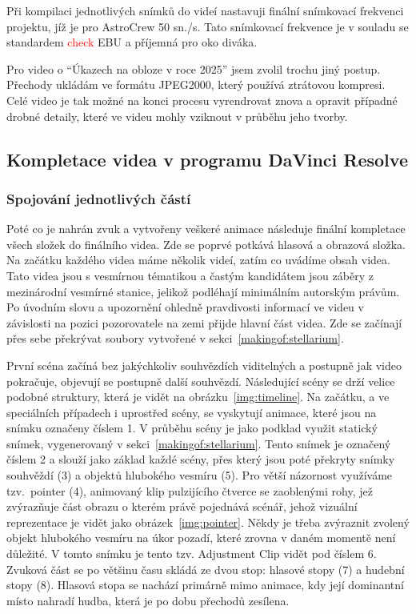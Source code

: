 \documentclass[12pt,a4paper,titlepage]{article}
\begin{document}
Při kompilaci jednotlivých snímků do videí nastavuji finální snímkovací frekvenci projektu, jíž je pro AstroCrew 50 sn./s. Tato snímkovací frekvence je v souladu se standardem \textcolor{red}{check} EBU a příjemná pro oko diváka.

Pro video o \enquote{Úkazech na obloze v roce 2025} jsem zvolil trochu jiný postup. Přechody ukládám ve formátu JPEG2000, který používá ztrátovou kompresi. Celé video je tak možné na konci procesu vyrendrovat znova a opravit případné drobné detaily, které ve videu mohly vziknout v průběhu jeho tvorby.
\subsection{Kompletace videa v programu DaVinci Resolve}\label{makingof:resolve}
\subsubsection{Spojování jednotlivých částí}\label{makingof:resolve:merging}
Poté co je nahrán zvuk a vytvořeny veškeré animace následuje finální kompletace všech složek do finálního videa. Zde se poprvé potkává hlasová a obrazová složka. Na začátku každého videa máme několik videí, zatím co uvádíme obsah videa. Tato videa jsou s vesmírnou tématikou a častým kandidátem jsou záběry z mezinárodní vesmírné stanice, jelikož podléhají minimálním autorským právům. Po úvodním slovu a upozornění ohledně pravdivosti informací ve videu v závislosti na pozici pozorovatele na zemi přijde hlavní část videa. Zde se začínají přes sebe překrývat soubory vytvořené v sekci~\ref{makingof:stellarium}.

První scéna začíná bez jakýchkoliv souhvězdích viditelných a postupně jak video pokračuje, objevují se postupně další souhvězdí. Následující scény se drží velice podobné struktury, která je vidět na obrázku~\ref{img:timeline}. Na začátku, a ve speciálních případech i uprostřed scény, se vyskytují animace, které jsou na snímku označeny číslem 1. V průběhu scény je jako podklad využit statický snímek, vygenerovaný v sekci~\ref{makingof:stellarium}. Tento snímek je označený číslem 2 a slouží jako základ každé scény, přes který jsou poté překryty snímky souhvěždí (3) a objektů hlubokého vesmíru (5). Pro větší názornost využíváme tzv.\ pointer (4), animovaný klip pulzijícího čtverce se zaoblenými rohy, jež zvýrazňuje část obrazu o kterém právě pojednává scénář, jehož vizuální reprezentace je vidět jako obrázek~\ref{img:pointer}. Někdy je třeba zvýraznit zvolený objekt hlubokého vesmíru na úkor pozadí, které zrovna v daném momentě není důležité. V tomto snímku je tento tzv. Adjustment Clip vidět pod číslem 6. Zvuková část se po většinu času skládá ze dvou stop: hlasové stopy (7) a hudební stopy (8). Hlasová stopa se nachází primárně mimo animace, kdy její dominantní místo nahradí hudba, která je po dobu přechodů zesílena.
\end{document}
